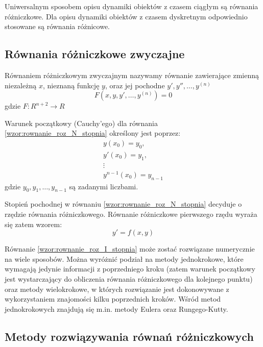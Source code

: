 Uniwersalnym sposobem opisu dynamiki obiektów z czasem ciągłym są równania różniczkowe. Dla opisu dynamiki obiektów z czasem dyskretnym odpowiednio stosowane są równania różnicowe\cite{Gutenbaum}.
\subsection{Równania różniczkowe zwyczajne}

Równaniem różniczkowym zwyczajnym nazywamy równanie zawierające zmienną niezależną $x$, nieznaną funkcję $y$, oraz jej pochodne $y', y'', \hdots, y^{(n)}$ \cite{BCh_2001}
\begin{equation}
	\label{wzor:rownanie_roz_N_stopnia}
	F(x,y,y',\hdots,y^{(n)}) = 0
\end{equation}
gdzie $F:R^{n+2} \rightarrow R$

Warunek początkowy (Cauchy'ego) dla równania \ref{wzor:rownanie_roz_N_stopnia} określony jest poprzez: 
\begin{equation}
\begin{array}{c}
y(x_0)       =  y_0,     \\
y'(x_0)      =  y_1,     \\
\vdots			   	     \\
y^{n-1}(x_0) = y_{n-1}
\end{array}
\end{equation}
gdzie $y_0, y_1, \hdots, y_{n-1}$ są zadanymi liczbami.

Stopień pochodnej w równaniu \ref{wzor:rownanie_roz_N_stopnia} decyduje o rzędzie równania różniczkowego. Równanie różniczkowe pierwszego rzędu wyraża się zatem wzorem:
\begin{equation}
	\label{wzor:rownanie_roz_I_stopnia}
	y' = f(x,y)
\end{equation}

Równanie \ref{wzor:rownanie_roz_I_stopnia} może zostać rozwiązane numerycznie na wiele sposobów. Można wyróżnić podział na metody jednokrokowe, które wymagają jedynie informacji z poprzedniego kroku (zatem warunek początkowy jest wystarczający do obliczenia równania różniczkowego dla kolejnego punktu) oraz metody wielokrokowe, w których rozwiązanie jest dokonowywane z wykorzystaniem znajomości kilku poprzednich kroków. Wśród metod jednokrokowych znajdują się m.in. metody Eulera oraz Rungego-Kutty.

\subsection{Metody rozwiązywania równań różniczkowych}

